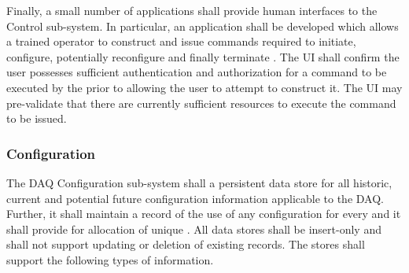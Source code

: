Finally, a small number of applications shall provide human interfaces to the Control sub-system. 
In particular, an application shall be developed which allows a trained operator to construct and issue commands required to initiate, configure, potentially reconfigure and finally terminate . 
The UI shall confirm the user possesses sufficient authentication and authorization for a command to be executed by the  prior to allowing the user to attempt to construct it. 
The UI may pre-validate that there are currently sufficient resources to execute the command to be issued.


\subsubsection{Configuration}
\label{sec:daq:design:ccm:configuration}

The DAQ Configuration sub-system shall a persistent data store for all historic, current and potential future configuration information applicable to the DAQ.
Further, it shall maintain a record of the use of any configuration for every  and it shall provide for allocation of unique . 
All data stores shall be insert-only and shall not support updating or deletion of existing records.
The stores shall support the following types of information.

